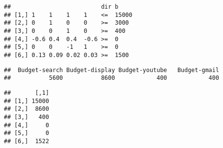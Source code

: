 \documentclass[]{article}
\newenvironment{Shaded}{\begin{snugshade}}{\end{snugshade}}
\newcommand{\KeywordTok}[1]{\textcolor[rgb]{0.13,0.29,0.53}{\textbf{#1}}}
\newcommand{\DecValTok}[1]{\textcolor[rgb]{0.00,0.00,0.81}{#1}}
\newcommand{\StringTok}[1]{\textcolor[rgb]{0.31,0.60,0.02}{#1}}
\newcommand{\OperatorTok}[1]{\textcolor[rgb]{0.81,0.36,0.00}{\textbf{#1}}}
\newcommand{\NormalTok}[1]{#1}
\begin{document}
\begin{verbatim}
##                          dir b    
## [1,] 1    1    1    1    <=  15000
## [2,] 0    1    0    0    >=  3000 
## [3,] 0    0    1    0    >=  400  
## [4,] -0.6 0.4  0.4  -0.6 >=  0    
## [5,] 0    0    -1   1    >=  0    
## [6,] 0.13 0.09 0.02 0.03 >=  1500
\end{verbatim}

\begin{Shaded}
\end{Shaded}

\begin{verbatim}
##  Budget-search Budget-display Budget-youtube   Budget-gmail 
##           5600           8600            400            400
\end{verbatim}

\begin{Shaded}
\end{Shaded}

\begin{verbatim}
##       [,1]
## [1,] 15000
## [2,]  8600
## [3,]   400
## [4,]     0
## [5,]     0
## [6,]  1522
\end{verbatim}
\end{document}
